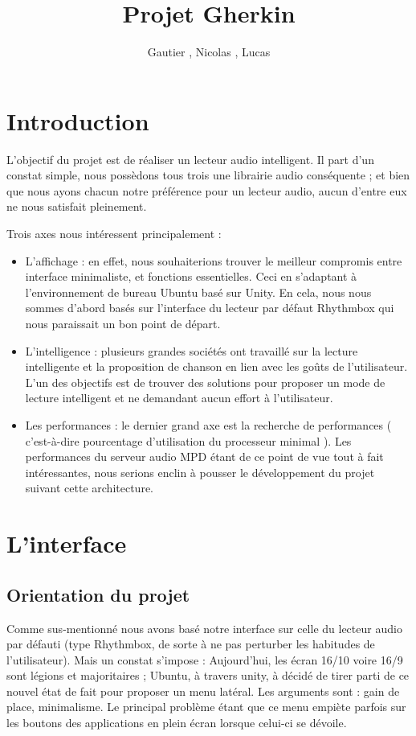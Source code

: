 \documentclass{report}
\author{Gautier \bsc{Dakin}, Nicolas \bsc{Ehrhardt}, Lucas \bsc{Plaetevoet}}
\title{Projet Gherkin}
\begin{document}
\maketitle

\section*{Introduction}
L'objectif du projet est de réaliser un lecteur audio intelligent. Il part d'un constat simple, nous possèdons tous trois une librairie audio conséquente ; et bien que nous ayons chacun notre préférence pour un lecteur audio, aucun d'entre eux ne nous satisfait pleinement.

Trois axes nous intéressent principalement :
\begin{itemize}
\item L'affichage : en effet, nous souhaiterions trouver le meilleur compromis entre interface minimaliste, et fonctions essentielles. Ceci en s'adaptant à l'environnement de bureau Ubuntu basé sur Unity. En cela, nous nous sommes d'abord basés sur l'interface du lecteur par défaut Rhythmbox qui nous paraissait un bon point de départ.

\item L'intelligence : plusieurs grandes sociétés ont travaillé sur la lecture intelligente et la proposition de chanson en lien avec les goûts de l'utilisateur. L'un des objectifs est de trouver des solutions pour proposer un mode de lecture intelligent et ne demandant aucun effort à l'utilisateur.

\item Les performances : le dernier grand axe est la recherche de performances ( c'est-à-dire pourcentage d'utilisation du processeur minimal ). Les performances du serveur audio MPD étant de ce point de vue tout à fait intéressantes, nous serions enclin à pousser le développement du projet suivant cette architecture.
\end{itemize}

\section*{L'interface}
\subsection*{Orientation du projet}
Comme sus-mentionné nous avons basé notre interface sur celle du lecteur audio par défauti (type Rhythmbox, de sorte à ne pas perturber les habitudes de l'utilisateur). Mais un constat s'impose : Aujourd'hui, les écran 16/10 voire 16/9 sont légions et majoritaires ; Ubuntu, à travers unity, à décidé de tirer parti de ce nouvel état de fait pour proposer un menu latéral. Les arguments sont : gain de place, minimalisme. Le principal problème étant que ce menu empiète parfois sur les boutons des applications en plein écran lorsque celui-ci se dévoile.
\end{document}
